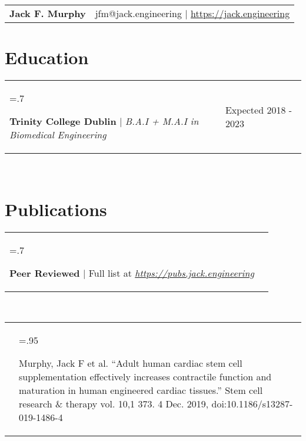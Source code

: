 \documentclass[letterpaper,11pt]{article}
\newcommand{\projHeadings}[2]{
    \begin{tabularx}{\textwidth} {>{\hsize=.7\textwidth\raggedright\arraybackslash}X 
   >{\raggedleft\arraybackslash}X}
      #1 & \small#2 \\
    \end{tabularx}
    \\
}
\newcommand{\projitems}[1]{
    \begin{tabularx}{\textwidth} {>{\raggedleft\arraybackslash}X | >{\hsize=.95\textwidth\raggedright\arraybackslash}X}
      & \small#1 \\
    \end{tabularx}
    \\
}
\newcommand{\heading}[3]{
    \hspace{-9mm}
    \begin{tabular}{p{.4\textwidth} >{\raggedleft}p{.57\textwidth}}
        \textbf{\Huge{#1}}\vspace{5mm} & #2 $|$ #3 \\
    \end{tabular}
}
\begin{document}
\heading
    {Jack F. Murphy}
    {jfm@jack.engineering}
    {\href{https://jack.engineering}{https://jack.engineering}}

\section*{Education}
    \projHeadings
          {\textbf{Trinity College Dublin} $|$ \emph{B.A.I + M.A.I in Biomedical Engineering}}
          {Expected 2018 - 2023}
          {}

\section*{Publications}
    \projHeadings
          {\textbf{Peer Reviewed} $|$ Full list at \emph{\href{https://pubs.jack.engineering}{https://pubs.jack.engineering}}}
          {}
         \projitems
            {Murphy, Jack F et al. “Adult human cardiac stem cell supplementation effectively increases contractile function and maturation in human engineered cardiac tissues.” Stem cell research \& therapy vol. 10,1 373. 4 Dec. 2019, doi:10.1186/s13287-019-1486-4}

\end{document}
